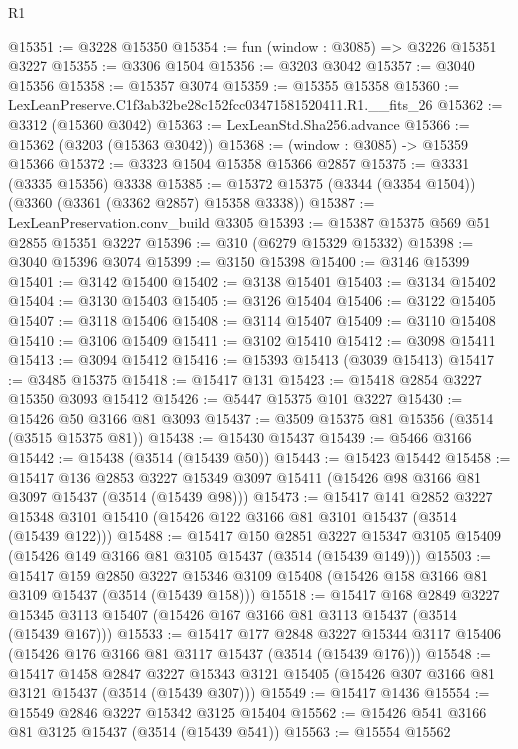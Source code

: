 \begin{lexlean}{R1}
\begin{coremodule}
@15351 := @3228 @15350
@15354 := fun (window : @3085) => @3226 @15351 @3227
@15355 := @3306 @1504
@15356 := @3203 @3042
@15357 := @3040 @15356
@15358 := @15357 @3074
@15359 := @15355 @15358
@15360 := LexLeanPreserve.C1f3ab32be28c152fcc03471581520411.R1.__fits_26
@15362 := @3312 (@15360 @3042)
@15363 := LexLeanStd.Sha256.advance
@15366 := @15362 (@3203 (@15363 @3042))
@15368 := (window : @3085) -> @15359 @15366
@15372 := @3323 @1504 @15358 @15366 @2857
@15375 := @3331 (@3335 @15356) @3338
@15385 := @15372 @15375 (@3344 (@3354 @1504)) (@3360 (@3361 (@3362 @2857) @15358 @3338))
@15387 := LexLeanPreservation.conv_build @3305
@15393 := @15387 @15375 @569 @51 @2855 @15351 @3227
@15396 := @310 (@6279 @15329 @15332)
@15398 := @3040 @15396 @3074
@15399 := @3150 @15398
@15400 := @3146 @15399
@15401 := @3142 @15400
@15402 := @3138 @15401
@15403 := @3134 @15402
@15404 := @3130 @15403
@15405 := @3126 @15404
@15406 := @3122 @15405
@15407 := @3118 @15406
@15408 := @3114 @15407
@15409 := @3110 @15408
@15410 := @3106 @15409
@15411 := @3102 @15410
@15412 := @3098 @15411
@15413 := @3094 @15412
@15416 := @15393 @15413 (@3039 @15413)
@15417 := @3485 @15375
@15418 := @15417 @131
@15423 := @15418 @2854 @3227 @15350 @3093 @15412
@15426 := @5447 @15375 @101 @3227
@15430 := @15426 @50 @3166 @81 @3093
@15437 := @3509 @15375 @81 @15356 (@3514 (@3515 @15375 @81))
@15438 := @15430 @15437
@15439 := @5466 @3166
@15442 := @15438 (@3514 (@15439 @50))
@15443 := @15423 @15442
@15458 := @15417
    @136
    @2853
    @3227
    @15349
    @3097
    @15411
    (@15426 @98 @3166 @81 @3097 @15437 (@3514 (@15439 @98)))
@15473 := @15417
    @141
    @2852
    @3227
    @15348
    @3101
    @15410
    (@15426 @122 @3166 @81 @3101 @15437 (@3514 (@15439 @122)))
@15488 := @15417
    @150
    @2851
    @3227
    @15347
    @3105
    @15409
    (@15426 @149 @3166 @81 @3105 @15437 (@3514 (@15439 @149)))
@15503 := @15417
    @159
    @2850
    @3227
    @15346
    @3109
    @15408
    (@15426 @158 @3166 @81 @3109 @15437 (@3514 (@15439 @158)))
@15518 := @15417
    @168
    @2849
    @3227
    @15345
    @3113
    @15407
    (@15426 @167 @3166 @81 @3113 @15437 (@3514 (@15439 @167)))
@15533 := @15417
    @177
    @2848
    @3227
    @15344
    @3117
    @15406
    (@15426 @176 @3166 @81 @3117 @15437 (@3514 (@15439 @176)))
@15548 := @15417
    @1458
    @2847
    @3227
    @15343
    @3121
    @15405
    (@15426 @307 @3166 @81 @3121 @15437 (@3514 (@15439 @307)))
@15549 := @15417 @1436
@15554 := @15549 @2846 @3227 @15342 @3125 @15404
@15562 := @15426 @541 @3166 @81 @3125 @15437 (@3514 (@15439 @541))
@15563 := @15554 @15562

\end{coremodule}
\end{lexlean}
